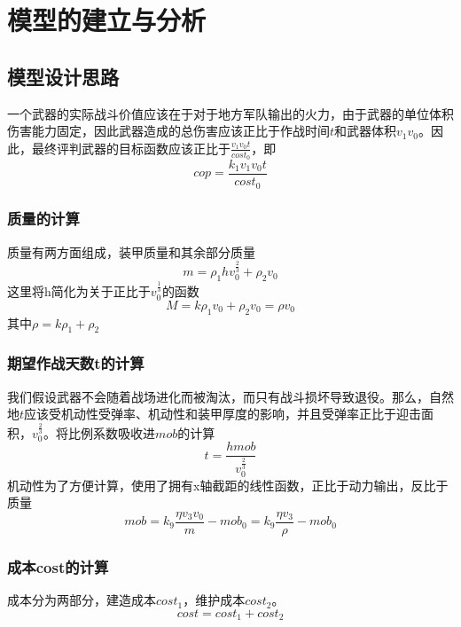 \documentclass[UTF8]{mcmthesis}
\begin{document}
\section{模型的建立与分析}
\subsection{模型设计思路}
一个武器的实际战斗价值应该在于对于地方军队输出的火力，由于武器的单位体积伤害能力固定，因此武器造成的总伤害应该正比于作战时间$t$和武器体积$v_1v_0$。因此，最终评判武器的目标函数应该正比于$\frac{v_1v_0t}{cost_0}$，即
\begin{equation}
cop=\frac{k_1v_1v_0t}{cost_0}
\end{equation}
\subsubsection{质量的计算}
质量有两方面组成，装甲质量和其余部分质量
\begin{equation}
m=\rho_1hv_0^{\frac{2}{3}}+\rho_2v_0
\end{equation}
这里将h简化为关于正比于$v_0^{\frac{1}{3}}$的函数
\begin{equation}
M=k\rho_1v_0+\rho_2v_0=\rho v_0
\end{equation}
其中$\rho=k\rho_1+\rho_2$
\subsubsection{期望作战天数t的计算}
我们假设武器不会随着战场进化而被淘汰，而只有战斗损坏导致退役。那么，自然地$t$应该受机动性受弹率、机动性和装甲厚度的影响，并且受弹率正比于迎击面积，$v_0^{\frac{2}{3}}$。将比例系数吸收进$mob$的计算
\begin{equation}
t=\frac{h mob}{v_0^{\frac{2}{3}}}
\end{equation}
机动性为了方便计算，使用了拥有x轴截距的线性函数，正比于动力输出，反比于质量
\begin{equation}
mob=k_9\frac{\eta v_3v_0}{m}-mob_0=k_9\frac{\eta v_3}{\rho}-mob_0
\end{equation}
\subsubsection{成本cost的计算}
成本分为两部分，建造成本$cost_1$，维护成本$cost_2$。
\begin{equation}
cost=cost_1+cost_2
\end{equation}
\end{document}
